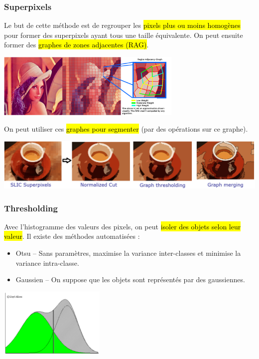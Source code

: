 \documentclass[letterpaper, 12pt]{article}
\newcommand{\alinea}{
\hspace*{0.5cm}}
\begin{document}
		\subsubsection{Superpixels}
			\alinea Le but de cette méthode est de regrouper les \hl{pixels plus ou moins homogènes} pour former des superpixels ayant tous
				une taille équivalente. On peut ensuite former des \hl{graphes de zones adjacentes (RAG)}.
			\begin{center}
				\includegraphics[width=3.5in]{Images/rag}
			\end{center}
			On peut utiliser ces \hl{graphes pour segmenter} (par des opérations sur ce graphe).
			\begin{center}
				\includegraphics[width=5.5in]{Images/rag2}
			\end{center}
		\subsubsection{Thresholding}
			\begin{minipage}{0.66\textwidth}
				\alinea Avec l'histogramme des valeurs des pixels, on peut \hl{isoler des objets selon leur valeur}. 
				Il existe des méthodes automatisées :
				\begin{itemize}
					\setlength\itemsep{0cm}
					\item Otsu -- Sans paramètres, maximise la variance inter-classes et minimise la variance intra-classe.
					\item Gaussien -- On suppose que les objets sont représentés par des gaussiennes.
				\end{itemize}
			\end{minipage}\hfill
			\begin{minipage}{0.24\textwidth}
				\begin{center}
					\includegraphics[width=2in]{Images/thresholding}
				\end{center}
			\end{minipage}
\end{document}
